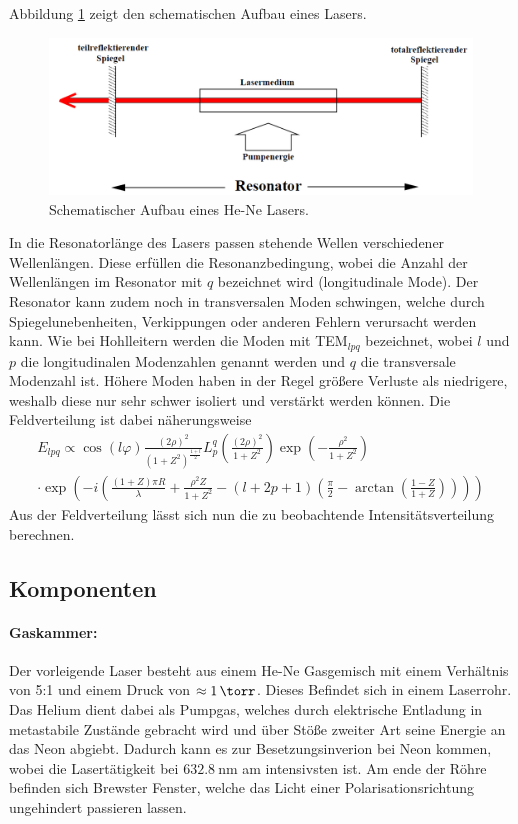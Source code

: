 Abbildung \ref{resonator} zeigt den schematischen Aufbau eines Lasers.
\begin{figure}[h!]
\centering
	\includegraphics[width = 12cm]{img/laser_schem.png}
	\caption{Schematischer Aufbau eines He-Ne Lasers.\cite{V61}}
	\label{resonator}
\end{figure}

In die Resonatorlänge des Lasers passen stehende Wellen verschiedener Wellenlängen.
Diese erfüllen die Resonanzbedingung, wobei die Anzahl der Wellenlängen im Resonator mit $q$ bezeichnet wird (longitudinale Mode).
Der Resonator kann zudem noch in transversalen Moden schwingen, welche durch Spiegelunebenheiten, Verkippungen oder anderen Fehlern verursacht werden kann.
Wie bei Hohlleitern werden die Moden mit TEM$_{lpq}$ bezeichnet, wobei $l$ und $p$ die longitudinalen Modenzahlen genannt werden und $q$ die transversale Modenzahl ist.
Höhere Moden haben in der Regel größere Verluste als niedrigere, weshalb diese nur sehr schwer isoliert und verstärkt werden können.
Die Feldverteilung ist dabei näherungsweise
\begin{align*}
	E_{lpq} \propto \cos\left({l \varphi}\right) \frac{(2\rho)^2}{(1+Z^2)^\frac{1+l}{2}} L_p^q\left(\frac{(2\rho)^2}{1+Z^2} \right) \exp\left(-\frac{\rho^2}{1+Z^2} \right) \\
	\cdot \exp\left(-i\left(\frac{(1+Z)\pi R}{\lambda} + \frac{\rho^2 Z}{1+Z^2}-(l+2p+1) \left(\frac{\pi}{2}-\arctan \left(\frac{1-Z}{1+Z} \right) \right) \right) \right)
\end{align*}
Aus der Feldverteilung lässt sich nun die zu beobachtende Intensitätsverteilung berechnen.

\subsection{Komponenten} %
\label{sub:komponenten}
\paragraph{Gaskammer:}
Der vorleigende Laser besteht aus einem He-Ne Gasgemisch mit einem Verhältnis von 5:1 und einem Druck von $\approx \SI{1}{\torr}$.
Dieses Befindet sich in einem Laserrohr.
Das Helium dient dabei als Pumpgas, welches durch elektrische Entladung in metastabile Zustände gebracht wird und über Stöße zweiter Art seine Energie an das Neon abgiebt.
Dadurch kann es zur Besetzungsinverion bei Neon kommen, wobei die Lasertätigkeit bei $\SI{632.8}{\nano\meter}$ am intensivsten ist.
Am ende der Röhre befinden sich Brewster Fenster, welche das Licht einer Polarisationsrichtung ungehindert passieren lassen.
